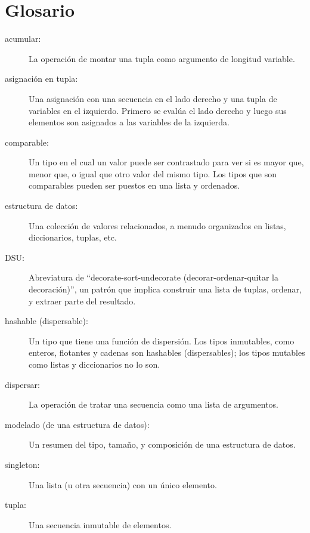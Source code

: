 \section{Glosario}

\begin{description}

\item[acumular:] La operación de montar una tupla
como argumento de longitud variable.

\item[asignación en tupla:] Una asignación con una secuencia en el
lado derecho y una tupla de variables en el izquierdo. Primero
se evalúa el lado derecho y luego sus elementos son asignados a las
variables de la izquierda.

\item[comparable:] Un tipo en el cual un valor puede ser contrastado para ver si es
mayor que, menor que, o igual que otro valor del mismo tipo.
Los tipos que son comparables pueden ser puestos en una lista y ordenados.

\item[estructura de datos:] Una colección de valores relacionados, a menudo
organizados en listas, diccionarios, tuplas, etc.

\item[DSU:] Abreviatura de ``decorate-sort-undecorate
(decorar-ordenar-quitar la decoración)'',
un patrón que implica construir una lista de tuplas, ordenar, y
extraer parte del resultado.

\item[hashable (dispersable):] Un tipo que tiene una función de dispersión. Los tipos
inmutables, como enteros,
flotantes y cadenas son hashables (dispersables); los tipos mutables como listas y
diccionarios no lo son.

\item[dispersar:] La operación de tratar una secuencia como una lista de
argumentos.

\item[modelado (de una estructura de datos):] Un resumen del tipo,
tamaño, y composición de una estructura de datos.

\item[singleton:] Una lista (u otra secuencia) con un único elemento.

\item[tupla:] Una secuencia inmutable de elementos.

\end{description}


